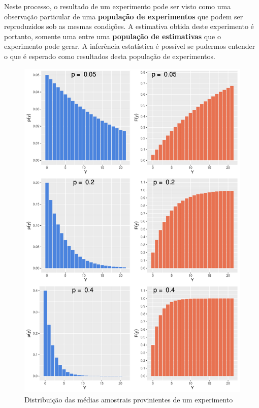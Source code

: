 \documentclass[
]{book}
\begin{document}
Neste processo, o resultado de um experimento pode ser visto como uma observação particular de uma \textbf{população de experimentos} que podem ser reproduzidos sob as mesmas condições. A estimativa obtida deste experimento é portanto, somente uma entre uma \textbf{população de estimativas} que o experimento pode gerar. A inferência estatística é possível se pudermos entender o que é esperado como resultados desta população de experimentos.

\begin{figure}

{\centering \includegraphics[width=20.83in]{probest-cambientais_files/figure-latex/unnamed-chunk-103-1} 

}

\caption{Distribuição das médias amostrais provinientes de um experimento}\label{fig:unnamed-chunk-103}
\end{figure}
\end{document}
